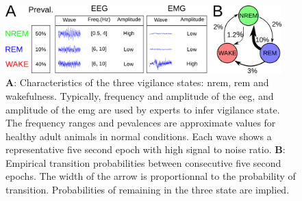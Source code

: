 
\begin{figure}[h!]

  \centering    
    \includegraphics[width=0.95\textwidth]{figures/sleep_description.pdf}
  \caption{
  \textbf{A}: Characteristics of the three vigilance states: \gls{nrem}, \gls{rem} and wakefulness.
  Typically, frequency and amplitude of the \acrfull{eeg}, and amplitude of the \acrfull{emg} are used by experts to infer vigilance state.
  The frequency ranges and pevalences are approximate values for healthy adult animals in normal conditions.
  Each wave shows a representative five second epoch with high signal to noise ratio.
  \textbf{B}: Empirical transition probabilities between consecutive five second epochs. The width of the arrow is proportionnal to the probability of transition.
  Probabilities of remaining in the three state are implied.
  \label{fig:sleep_description}
  }
           
\end{figure}
